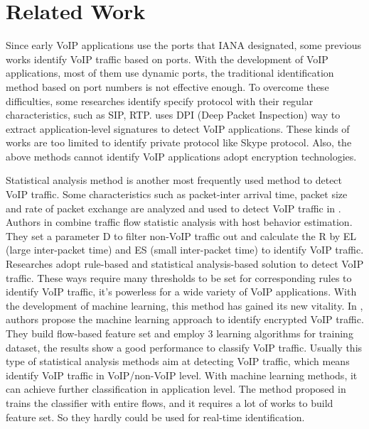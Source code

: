 \documentclass[conference]{IEEEtran}
\begin{document}
\section{Related Work}
\label{sec:relatedwork}


Since early VoIP applications use the ports that IANA designated, some previous works identify VoIP traffic based on ports. With the development of VoIP applications, most of them use dynamic ports, the traditional identification method based on port numbers is not effective enough. To overcome these difficulties, some researches \cite{14,16} identify specify protocol with their regular characteristics, such as SIP, RTP. \cite{18} uses DPI (Deep Packet Inspection) way to extract application-level signatures to detect VoIP applications. These kinds of works are too limited to identify private protocol like Skype protocol. Also, the above methods cannot identify VoIP applications adopt encryption technologies.

Statistical analysis method is another most frequently used method to detect VoIP traffic. Some characteristics such as packet-inter arrival time, packet size and rate of packet exchange are analyzed and used to detect VoIP traffic in \cite{2}. Authors in \cite{19} combine traffic flow statistic analysis with host behavior estimation. They set a parameter D to filter non-VoIP traffic out and calculate the R by EL (large inter-packet time) and ES (small inter-packet time) to identify VoIP traffic. Researches \cite{20,21,haris2018analysis} adopt rule-based and statistical analysis-based solution to detect VoIP traffic. These ways require many thresholds to be set for corresponding rules to identify VoIP traffic, it's powerless for a wide variety of VoIP applications. With the development of machine learning, this method has gained its new vitality. In \cite{5}, authors propose the machine learning approach to identify encrypted VoIP traffic. They build flow-based feature set and employ 3 learning algorithms for training dataset, the results show a good performance to classify VoIP traffic. Usually this type of statistical analysis methods aim at detecting VoIP traffic, which means identify VoIP traffic in VoIP/non-VoIP level. With machine learning methods, it can achieve further classification in application level. The method proposed in \cite{5} trains the classifier with entire flows, and it requires a lot of works to build feature set. So they hardly could be used for real-time identification.
\end{document}
